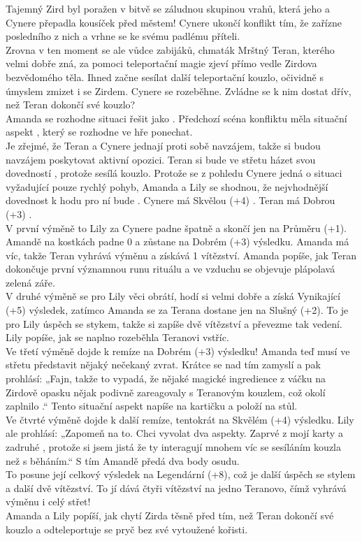 Tajemný Zird byl poražen v bitvě se záludnou skupinou vrahů, která jeho a Cynere přepadla kousíček před městem! Cynere ukončí konflikt tím, že zařízne posledního z nich a vrhne se ke svému padlému příteli. \\
Zrovna v ten moment se ale vůdce zabijáků, chmaták Mrštný Teran, kterého velmi dobře zná, za pomoci teleportační magie zjeví přímo vedle Zirdova bezvědomého těla. Ihned začne sesílat další teleportační kouzlo, očividně s úmyslem zmizet i se Zirdem. Cynere se rozeběhne. Zvládne se k nim dostat dřív, než Teran dokončí své kouzlo?\\
Amanda se rozhodne situaci řešit jako . Předchozí scéna konfliktu měla situační aspekt , který se rozhodne ve hře ponechat.\\
Je zřejmé, že Teran a Cynere jednají proti sobě navzájem, takže si budou navzájem poskytovat aktivní opozici. Teran si bude ve střetu házet svou dovedností , protože sesílá kouzlo. Protože se z pohledu Cynere jedná o situaci vyžadující pouze rychlý pohyb, Amanda a Lily se shodnou, že nejvhodnější dovednost k hodu pro ní bude .
Cynere má Skvělou (+4) . Teran má Dobrou (+3) .\\
V první výměně to Lily za Cynere padne špatně a skončí jen na Průměru (+1). Amandě na kostkách padne 0 a zůstane na Dobrém (+3) výsledku. Amanda má víc, takže Teran vyhrává výměnu a získává 1 vítězství. Amanda popíše, jak Teran dokončuje první významnou runu rituálu a ve vzduchu se objevuje plápolavá zelená záře.\\
V druhé výměně se pro Lily věci obrátí, hodí si velmi dobře a získá Vynikající (+5) výsledek, zatímco Amanda se za Terana dostane jen na Slušný (+2). To je pro Lily úspěch se stykem, takže si zapíše dvě vítězství a převezme tak vedení. Lily popíše, jak se naplno rozeběhla Teranovi vstříc.\\
Ve třetí výměně dojde k remíze na Dobrém (+3) výsledku! Amanda teď musí ve střetu představit nějaký nečekaný zvrat. Krátce se nad tím zamyslí a pak prohlásí: „Fajn, takže to vypadá, že nějaké magické ingredience z váčku na Zirdově opasku nějak podivně zareagovaly s Teranovým kouzlem, což okolí zaplnilo .“ Tento situační aspekt napíše na kartičku a položí na stůl. \\
Ve čtvrté výměně dojde k další remíze, tentokrát na Skvělém (+4) výsledku. Lily ale prohlásí: „Zapomeň na to. Chci vyvolat dva aspekty. Zaprvé  z mojí karty a zadruhé , protože si jsem jistá že ty interagují mnohem víc se sesíláním kouzla než s běháním.“ S tím Amandě předá dva body osudu.\\
To posune její celkový výsledek na Legendární (+8), což je další úspěch se stylem a další dvě vítězství. To jí dává čtyři vítězství na jedno Teranovo, čímž vyhrává výměnu i celý střet!\\
Amanda a Lily popíší, jak chytí Zirda těsně před tím, než Teran dokončí své kouzlo a odteleportuje se pryč bez své vytoužené kořisti.

